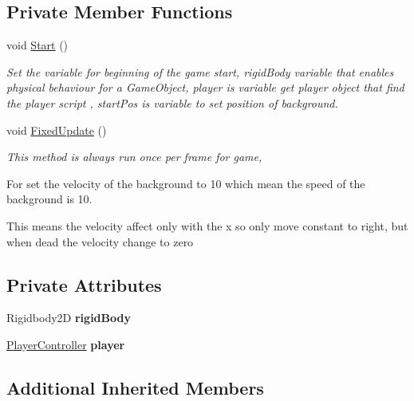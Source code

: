 \subsection*{Private Member Functions}
\begin{DoxyCompactItemize}
\item 
void \hyperlink{class_background_controller_ae65426d342e98cb14dab526c8bd5eadf}{Start} ()
\begin{DoxyCompactList}\small\item\em Set the variable for beginning of the game start, rigid\+Body variable that enables physical behaviour for a Game\+Object, player is variable get player object that find the player script , start\+Pos is variable to set position of background. \end{DoxyCompactList}\item 
void \hyperlink{class_background_controller_adb5ce992d04cb58e1978ee2cc5897934}{Fixed\+Update} ()
\begin{DoxyCompactList}\small\item\em This method is always run once per frame for game, 

For set the velocity of the background to 10 which mean the speed of the background is 10.

This means the velocity affect only with the x so only move constant to right, but when dead the velocity change to zero \end{DoxyCompactList}\end{DoxyCompactItemize}
\subsection*{Private Attributes}
\begin{DoxyCompactItemize}
\item 
\hypertarget{class_background_controller_ab00c8ac42acc6ad8ae78145b38c81a62}{}\label{class_background_controller_ab00c8ac42acc6ad8ae78145b38c81a62} 
Rigidbody2D {\bfseries rigid\+Body}
\item 
\hypertarget{class_background_controller_a7848b63c50c6dc0eee0787693958c0ca}{}\label{class_background_controller_a7848b63c50c6dc0eee0787693958c0ca} 
\hyperlink{class_player_controller}{Player\+Controller} {\bfseries player}
\end{DoxyCompactItemize}
\subsection*{Additional Inherited Members}


